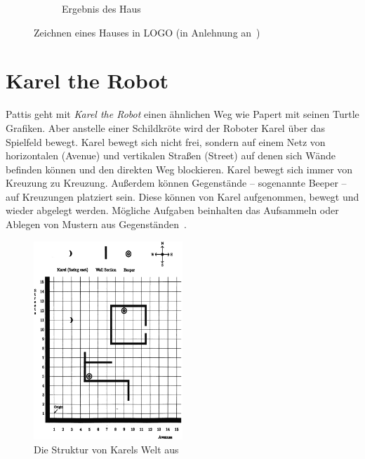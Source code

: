 \begin{figure}
\begin{subfigure}[b]{0.3\textwidth}
        \caption{Ergebnis des Haus}
        \label{fig:related:turtle:house:result}
    \end{subfigure}
    \caption{Zeichnen eines Hauses in LOGO (in Anlehnung an~\cite[14-15]{papert1980})}
    \label{fig:related:turtle:square}
\end{figure}

\section{Karel the Robot}
\label{sec:related:karel}

Pattis geht mit \textit{Karel the Robot} einen ähnlichen Weg wie Papert mit seinen Turtle Grafiken. Aber anstelle einer Schildkröte wird der Roboter Karel über das Spielfeld bewegt. Karel bewegt sich nicht frei, sondern auf einem Netz von horizontalen (Avenue) und vertikalen Straßen (Street) auf denen sich Wände befinden können und den direkten Weg blockieren. Karel bewegt sich immer von Kreuzung zu Kreuzung. Außerdem können Gegenstände -- sogenannte Beeper -- auf Kreuzungen platziert sein. Diese können von Karel aufgenommen, bewegt und wieder abgelegt werden. Mögliche Aufgaben beinhalten das Aufsammeln oder Ablegen von Mustern aus Gegenständen~\cite[1-3]{pattis1981}.

\begin{figure}
    \centering
    \includegraphics[width=0.5\textwidth]{gfx/related-karel.png}
    \caption{Die Struktur von Karels Welt aus~\cite[3]{pattis1981}}
    \label{fig:related:karel}
\end{figure}

